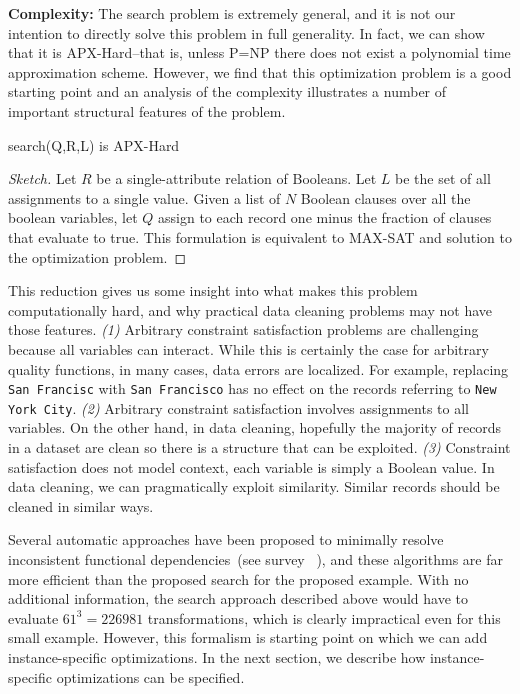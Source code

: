 \vspace{0.25em} \noindent\textbf{Complexity: } The search problem is extremely general, and it is not our intention to directly solve this problem in full generality.
In fact, we can show that it is APX-Hard--that is, unless P=NP there does not exist a polynomial time approximation scheme.
However, we find that this optimization problem is a good starting point and an analysis of the complexity illustrates a number of important structural features of the problem.

\begin{proposition}
\textsf{search(Q,R,L)} is \textsf{APX-Hard}
\end{proposition}
\begin{proof}[Sketch]
Let $R$ be a single-attribute relation of Booleans. Let $L$ be the set of all assignments to a single value.
Given a list of $N$ Boolean clauses over all the boolean variables, let $Q$ assign to each record one minus the fraction of clauses that evaluate to true. This formulation is equivalent to MAX-SAT and solution to the optimization problem.
\end{proof}

This reduction gives us some insight into what makes this problem computationally hard, and why practical data cleaning problems may not have those features. \emph{(1)} Arbitrary constraint satisfaction problems are challenging because all variables can interact. While this is certainly the case for arbitrary quality functions, in many cases, data errors are localized. For example, replacing \texttt{San Francisc} with \texttt{San Francisco} has no effect on the records referring to \texttt{New York City}.  \emph{(2)} Arbitrary constraint satisfaction involves assignments to all variables. On the other hand, in data cleaning, hopefully the majority of records in a dataset are clean so there is a structure that can be exploited.
 \emph{(3)} Constraint satisfaction does not model context, each variable is simply a Boolean value. In data cleaning, we can pragmatically exploit similarity. Similar records should be cleaned in similar ways.  

Several automatic approaches have been proposed to minimally resolve inconsistent functional dependencies~(see survey ~\cite{DBLP:conf/sigmod/ChuIKW16}), and these algorithms are far more efficient than the proposed search for the proposed example.
With no additional information, the search approach described above would have to evaluate $61^3 = 226981$ transformations, which is clearly impractical even for this small example.
However, this formalism is starting point on which we can add instance-specific optimizations.
In the next section, we describe how instance-specific optimizations can be specified.


